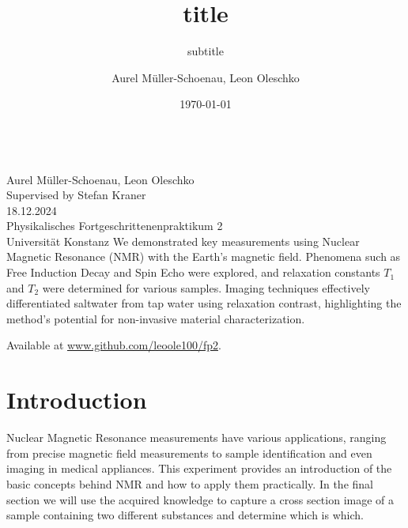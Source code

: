 \documentclass[
    parskip=half, 
    twoside=false,
    twocolumn=true,
    fontsize=11pt,
]{scrarticle}
\begin{document}
\title{title}
\subtitle{subtitle}
\author{Aurel Müller-Schoenau, Leon Oleschko}
\date{\dotdate\today}


\begin{titlepage}
    \sffamily
    \vspace*{3cm}
    {
        \fontsize{32}{32}
    }
    \vspace{.25cm}\\
    {
        \Large
        Aurel Müller-Schoenau, Leon Oleschko\\
        Supervised by Stefan Kraner
        \vspace{.05cm}\\
        18.12.2024
        \vspace{.25cm}\\
        \normalsize
        Physikalisches Fortgeschrittenenpraktikum 2\\
        Universität Konstanz
    }
    \vfill
    {
        \normalfont\normalsize
        We demonstrated key measurements using Nuclear Magnetic Resonance (NMR) with the Earth's magnetic field. Phenomena such as Free Induction Decay and Spin Echo were explored, and relaxation constants $T_1$ and $T_2$ were determined for various samples. Imaging techniques effectively differentiated saltwater from tap water using relaxation contrast, highlighting the method's potential for non-invasive material characterization.
    }
    \vfill
    \begin{flushright}
        Available at \url{www.github.com/leoole100/fp2}.
    \end{flushright}
\end{titlepage}

\section{Introduction}
Nuclear Magnetic Resonance measurements have various applications, ranging from precise magnetic field measurements to sample identification and even imaging in medical appliances. This experiment provides an introduction of the basic concepts behind NMR and how to apply them practically. In the final section we will use the acquired knowledge to capture a cross section image of a sample containing two different substances and determine which is which.
\end{document}
